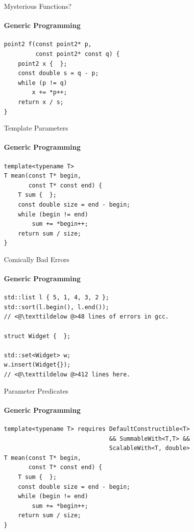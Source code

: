 \documentclass{beamer}
\begin{document}
    \begin{frame}[fragile]{Mysterious Functions?}
        \framesubtitle{Generic Programming}
        \begin{center}
        \begin{lstlisting}[caption={another mysterious, yet strangely familiar function (déjà vu?).}]
point2 f(const point2* p,
         const point2* const q) {
    point2 x {  };
    const double s = q - p;
    while (p != q)
        x += *p++;
    return x / s;
} \end{lstlisting}
        \end{center}
    \end{frame}

    \begin{frame}[fragile]{Template Parameters}
        \framesubtitle{Generic Programming}
        \begin{center}
            \begin{lstlisting}[caption={natural generalization of the function from the previous slides.}]
template<typename T>
T mean(const T* begin,
       const T* const end) {
    T sum {  };
    const double size = end - begin;
    while (begin != end)
        sum += *begin++;
    return sum / size;
} \end{lstlisting}
        \end{center}
    \end{frame}

    \begin{frame}[fragile]{Comically Bad Errors}
        \framesubtitle{Generic Programming}
        \begin{center}
            \begin{lstlisting}[caption={classic code examples that give ``bad'' template error messages.}]
std::list l { 5, 1, 4, 3, 2 };
std::sort(l.begin(), l.end());
// <@\texttildelow @>48 lines of errors in gcc.

struct Widget {  };

std::set<Widget> w;
w.insert(Widget{});
// <@\texttildelow @>412 lines here.\end{lstlisting}
        \end{center}
    \end{frame}

    \begin{frame}[fragile]{Parameter Predicates}
        \framesubtitle{Generic Programming}
        \begin{center}
        \begin{lstlisting}[caption={constraining the function template using a \texttt{requires} clause.}]
template<typename T> requires DefaultConstructible<T>
                              && SummableWith<T,T> &&
                              ScalableWith<T, double>
T mean(const T* begin,
       const T* const end) {
    T sum {  };
    const double size = end - begin;
    while (begin != end)
        sum += *begin++;
    return sum / size;
} \end{lstlisting}
        \end{center}
    \end{frame}
\end{document}
